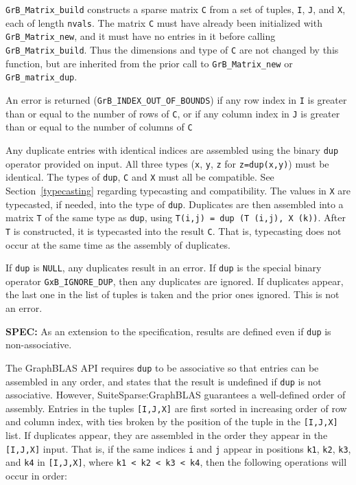 \documentclass[12pt]{article}
\begin{document}
{\verb'GrB_Matrix_build' constructs a sparse matrix \verb'C' from a set of
tuples, \verb'I', \verb'J', and \verb'X', each of length \verb'nvals'.  The
matrix \verb'C' must have already been initialized with \verb'GrB_Matrix_new',
and it must have no entries in it before calling \verb'GrB_Matrix_build'.  Thus
the dimensions and type of \verb'C' are not changed by this function, but are
inherited from the prior call to \verb'GrB_Matrix_new' or
\verb'GrB_matrix_dup'.

An error is returned (\verb'GrB_INDEX_OUT_OF_BOUNDS') if any row index in
\verb'I' is greater than or equal to the number of rows of \verb'C', or if any
column index in \verb'J' is greater than or equal to the number of columns of
\verb'C'

Any duplicate entries with identical indices are assembled using the binary
\verb'dup' operator provided on input.  All three types (\verb'x', \verb'y',
\verb'z' for \verb'z=dup(x,y)') must be identical.  The types of \verb'dup',
\verb'C' and \verb'X' must all be compatible.  See Section~\ref{typecasting}
regarding typecasting and compatibility.  The values in \verb'X' are
typecasted, if needed, into the type of \verb'dup'.  Duplicates are then
assembled into a matrix \verb'T' of the same type as \verb'dup', using
\verb'T(i,j) = dup (T (i,j), X (k))'.  After \verb'T' is constructed, it is
typecasted into the result \verb'C'.  That is, typecasting does not occur at
the same time as the assembly of duplicates.

If \verb'dup' is \verb'NULL', any duplicates result in an error.
If \verb'dup' is the special binary operator \verb'GxB_IGNORE_DUP', then
any duplicates are ignored.  If duplicates appear, the last one in the
list of tuples is taken and the prior ones ignored.  This is not an error.

\begin{alert}
{\bf SPEC:} As an extension to the specification, results are defined even if \verb'dup'
is non-associative.
\end{alert}

The GraphBLAS API requires \verb'dup' to be associative so
that entries can be assembled in any order, and states that the result is
undefined if \verb'dup' is not associative.  However, SuiteSparse:GraphBLAS
guarantees a well-defined order of assembly.  Entries in the tuples
\verb'[I,J,X]' are first sorted in increasing order of row and column index,
with ties broken by the position of the tuple in the \verb'[I,J,X]' list.  If
duplicates appear, they are assembled in the order they appear in the
\verb'[I,J,X]' input.  That is, if the same indices \verb'i' and \verb'j'
appear in positions \verb'k1', \verb'k2', \verb'k3', and \verb'k4' in
\verb'[I,J,X]', where \verb'k1 < k2 < k3 < k4', then the following operations
will occur in order:

}
\end{document}
